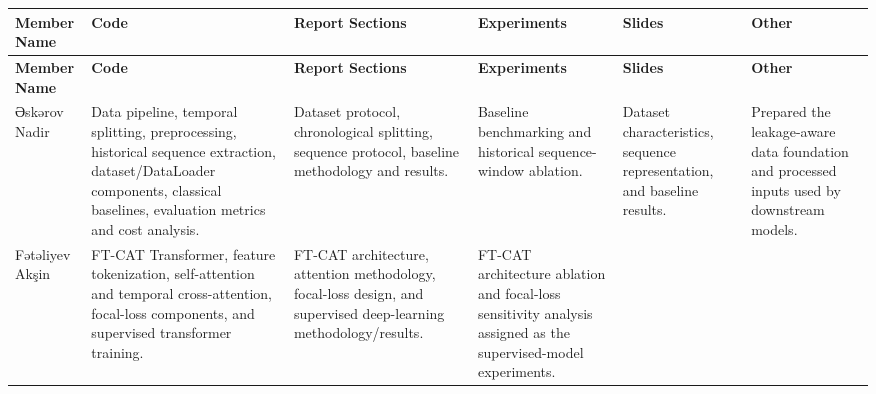 \documentclass[10pt,a4paper]{article}
\begin{document}
\begin{tabularx}{\textwidth}{
    >{\RaggedRight\arraybackslash}p{2.05cm}
    Y
    Y
    Y
    Y
    Y
}

\toprule

\textbf{Member Name} &
\textbf{Code} &
\textbf{Report Sections} &
\textbf{Experiments} &
\textbf{Slides} &
\textbf{Other} \\

\midrule
\endfirsthead

\toprule

\textbf{Member Name} &
\textbf{Code} &
\textbf{Report Sections} &
\textbf{Experiments} &
\textbf{Slides} &
\textbf{Other} \\

\midrule
\endhead


{\azfont Əskərov Nadir} &

Data pipeline, temporal splitting, preprocessing, historical sequence extraction,
dataset/DataLoader components, classical baselines, evaluation metrics and cost
analysis. &

Dataset protocol, chronological splitting, sequence protocol, baseline methodology
and results. &

Baseline benchmarking and historical sequence-window ablation. &

Dataset characteristics, sequence representation, and baseline results. &

Prepared the leakage-aware data foundation and processed inputs used by downstream
models. \\

\midrule


{\azfont Fətəliyev Akşin} &

FT-CAT Transformer, feature tokenization, self-attention and temporal
cross-attention, focal-loss components, and supervised transformer training. &

FT-CAT architecture, attention methodology, focal-loss design, and supervised
deep-learning methodology/results. &

FT-CAT architecture ablation and focal-loss sensitivity analysis assigned as the
supervised-model experiments. &


\end{tabularx}
\end{document}
